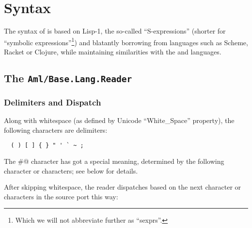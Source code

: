 
\chapter{Syntax}
\label{ch:aml-base-syntax}

The syntax of \AmlBase is based on Lisp-1, the so-called ``S-expressions'' (shorter for ``symbolic expressions''\footnote{Which we will not abbreviate further as ``sexprs''.}) and blatantly borrowing from languages such as Scheme, Racket or Clojure, while maintaining similarities with the \Aml and \AmlCore languages. 




\section[The Aml/Base.Lang.Reader]{The \lstinline!Aml/Base.Lang.Reader!}
\label{sec:aml-base-lang-reader}




\subsection{Delimiters and Dispatch}
\label{subsec:aml-base-lang-reader-delimiters-dispatch}

Along with whitespace (as defined by Unicode ``White\_Space'' property), the following characters are delimiters:

\begin{lstlisting}
  ( ) [ ] { } " ' ` ~ ;
\end{lstlisting}

The \lstinline@#@ character has got a special meaning, determined by the following character or characters; see below for details. 

After skipping whitespace, the \AmlBase reader dispatches based on the next character or characters in the source port this way:

